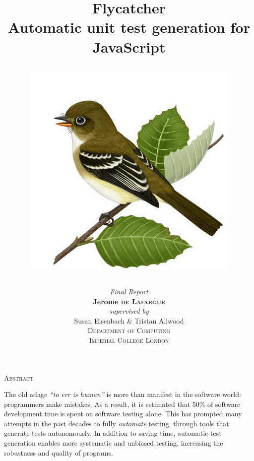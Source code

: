 \title
{
	{\Huge \textsf{Flycatcher} \\[0.2cm]}
	{\large \textsf{Automatic unit test generation for JavaScript}\\[0.5cm]}
	\begin{figure}[h]
		\centering
		\includegraphics[scale=0.3]{./components/preamble/flycatcher.jpg}
	\end{figure}
}
\author
{	
	{\emph{Final Report}}\\[6.5cm]
	{\large \textbf{Jerome \textsc{de Lafargue}}}\\[0.2cm]
	\emph{supervised by}\\
	Susan Eisenbach \& Tristan Allwood\\[1cm]
	\textsc{\normalsize Department of Computing}\\
	\textsc{\large Imperial College London}
}


\date{}
\pagestyle{empty}
\maketitle


\newpage
\mbox{}

\begin{center}
\textsc{\LARGE Abstract}\\[1.4cm]
\end{center}

The old adage \emph{``to err is human''} is more than manifest in the software world: programmers make mistakes. As a result, it is estimated that 50\% of software development time is spent on software testing alone. This has prompted many attempts in the past decades to fully \emph{automate} testing, through tools that generate tests autonomously. In addition to saving time, automatic test generation enables more systematic and unbiased testing, increasing the robustness and quality of programs.


